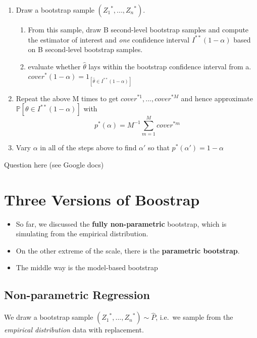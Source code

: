 \documentclass[]{book}
\providecommand{\tightlist}{%
  \setlength{\itemsep}{0pt}\setlength{\parskip}{0pt}}
\begin{document}
\begin{enumerate}
\def\labelenumi{\arabic{enumi}.}
\tightlist
\item
  Draw a bootstrap sample \(({Z_1}^*, ..., {Z_n}^*)\).

  \begin{enumerate}
  \def\labelenumii{\alph{enumii}.}
  \tightlist
  \item
    From this sample, draw B second-level bootstrap samples and compute
    the estimator of interest and \emph{one} confidence interval
    \(I^{**}(1-\alpha)\) based on B second-level bootstrap samples.
  \item
    evaluate whether \(\hat{\theta}\) lays within the bootstrap
    confidence interval from a.
    \(cover^*(1-\alpha) = 1_{[\hat{\theta} \in I^{**}(1-\alpha)]}\)
  \end{enumerate}
\item
  Repeat the above M times to get \(cover^{* 1}, ..., cover^{* M}\) and
  hence approximate \(\mathbb{P}[\theta \in I^{**}(1-\alpha)]\) with
  \[ p^*(\alpha) = M^{-1} \sum\limits_{m = 1}^M cover^{* m}\]
\item
  Vary \(\alpha\) in all of the steps above to find \(\alpha'\) so that
  \(p^*(\alpha') = 1- \alpha\)
\end{enumerate}

Question here (see Google docs)

\section{Three Versions of Boostrap}\label{three-versions-of-boostrap}

\begin{itemize}
\tightlist
\item
  So far, we discussed the \textbf{fully non-parametric} bootstrap,
  which is simulating from the empirical distribution.
\item
  On the other extreme of the scale, there is the \textbf{parametric
  bootstrap}.
\item
  The middle way is the model-based bootstrap
\end{itemize}

\subsection{Non-parametric
Regression}\label{non-parametric-regression-1}

We draw a bootstrap sample \(({Z_1}^*, ..., {Z_n}^*) \sim \hat{P}\),
i.e.~we sample from the \emph{empirical distribution} data with
replacement.
\end{document}
